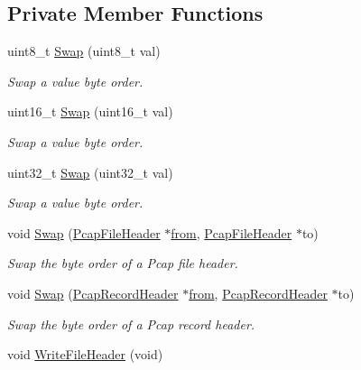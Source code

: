 \subsection*{Private Member Functions}
\begin{DoxyCompactItemize}
\item 
uint8\+\_\+t \hyperlink{classns3_1_1PcapFile_af5adf22a721473f1add1e002492f5587}{Swap} (uint8\+\_\+t val)
\begin{DoxyCompactList}\small\item\em Swap a value byte order. \end{DoxyCompactList}\item 
uint16\+\_\+t \hyperlink{classns3_1_1PcapFile_a626e8456233183d32aa229b53a629a43}{Swap} (uint16\+\_\+t val)
\begin{DoxyCompactList}\small\item\em Swap a value byte order. \end{DoxyCompactList}\item 
uint32\+\_\+t \hyperlink{classns3_1_1PcapFile_afe97f12e052ebd77a5c113c0d8f11d33}{Swap} (uint32\+\_\+t val)
\begin{DoxyCompactList}\small\item\em Swap a value byte order. \end{DoxyCompactList}\item 
void \hyperlink{classns3_1_1PcapFile_a12aa14e48a7b27a43ea0ab8abffa4834}{Swap} (\hyperlink{structns3_1_1PcapFile_1_1PcapFileHeader}{Pcap\+File\+Header} $\ast$\hyperlink{lte__amc_8m_a1b4c81ff74eb1a626b5ade44c81004b3}{from}, \hyperlink{structns3_1_1PcapFile_1_1PcapFileHeader}{Pcap\+File\+Header} $\ast$to)
\begin{DoxyCompactList}\small\item\em Swap the byte order of a Pcap file header. \end{DoxyCompactList}\item 
void \hyperlink{classns3_1_1PcapFile_af8cb5cf7b27cf92373709a577af671f4}{Swap} (\hyperlink{structns3_1_1PcapFile_1_1PcapRecordHeader}{Pcap\+Record\+Header} $\ast$\hyperlink{lte__amc_8m_a1b4c81ff74eb1a626b5ade44c81004b3}{from}, \hyperlink{structns3_1_1PcapFile_1_1PcapRecordHeader}{Pcap\+Record\+Header} $\ast$to)
\begin{DoxyCompactList}\small\item\em Swap the byte order of a Pcap record header. \end{DoxyCompactList}\item 
void \hyperlink{classns3_1_1PcapFile_a58124715fdc400c4ae0ff1c3ba8215ab}{Write\+File\+Header} (void)

\end{DoxyCompactItemize}
